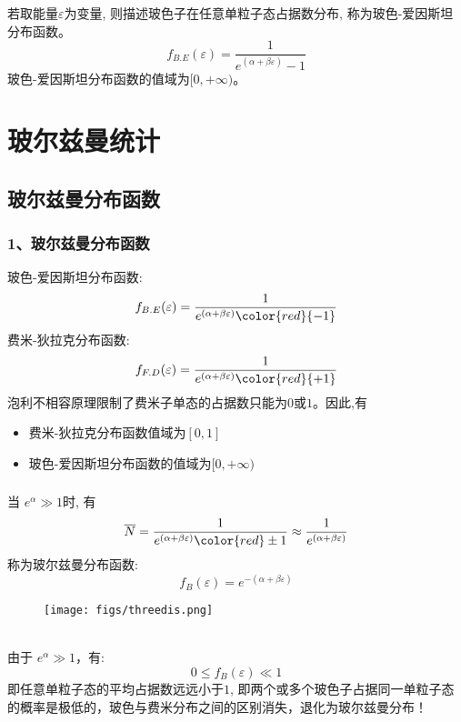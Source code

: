 \begin{frame}
  \frametitle{}
  若取能量$\varepsilon$为变量, 则描述玻色子在任意单粒子态占据数分布, 称为玻色-爱因斯坦分布函数。
\[ \boxed{f_{B.E}(\varepsilon) =  \frac{1}{e^{(\alpha +\beta \varepsilon)}-1}}\]
玻色-爱因斯坦分布函数的值域为$[0,+\infty)$。
\end{frame} 



\section{玻尔兹曼统计 }

\subsection{玻尔兹曼分布函数}
\begin{frame}
  \frametitle{ 1、玻尔兹曼分布函数}
  玻色-爱因斯坦分布函数:
\[f_{B.E}(\varepsilon) =  \frac{1}{e^{(\alpha +\beta \varepsilon)}\color{red}{-1}}\]
费米-狄拉克分布函数:
\[ f_{F.D}(\varepsilon) =  \frac{1}{e^{(\alpha +\beta \varepsilon)}\color{red}{+1}}\]
泡利不相容原理限制了费米子单态的占据数只能为$0$或$1$。因此,有
\begin{itemize}
  \item 费米-狄拉克分布函数值域为$[0,1]$
  \item 玻色-爱因斯坦分布函数的值域为$[0,+\infty)$
\end{itemize}
\end{frame} 

\begin{frame}
  \frametitle{}
  \begin{minipage}[b]{0.49\textwidth}
   当 $e^\alpha \gg  1$时, 有
  \[\overline{N}=\frac{1}{e^{(\alpha +\beta \varepsilon)}{\color{red} \pm 1}} \approx \frac{1}{e^{(\alpha +\beta \varepsilon)}}\]
  称为玻尔兹曼分布函数:
  \[\boxed{f_{B}(\varepsilon) = e^{-(\alpha +\beta \varepsilon)}}\]
  \end{minipage}
\begin{minipage}[b]{0.49\textwidth}
\begin{figure}[htbp]
  \centering
  \texttt{[image: figs/threedis.png]}
\end{figure}
\end{minipage}
~~\\
由于 $e^\alpha \gg  1$，有: $$0 \le f_{B}(\varepsilon) \ll  1 $$
即任意单粒子态的平均占据数远远小于$1$, 即两个或多个玻色子占据同一单粒子态的概率是极低的，玻色与费米分布之间的区别消失，退化为玻尔兹曼分布！ 
\end{frame} 


